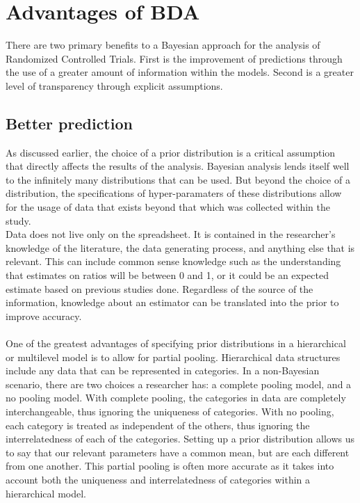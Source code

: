 \documentclass{article}
\begin{document}
\section{Advantages of BDA}
There are two primary benefits to a Bayesian approach for the analysis of Randomized Controlled Trials. First is the improvement of predictions through the use of a greater amount of information within the models. Second is a greater level of transparency through explicit assumptions. 
\subsection{Better prediction}
As discussed earlier, the choice of a prior distribution is a critical assumption that directly affects the results of the analysis. Bayesian analysis lends itself well to the infinitely many distributions that can be used. But beyond the choice of a distribution, the specifications of hyper-paramaters of these distributions allow for the usage of data that exists beyond that which was collected within the study.\\
Data does not live only on the spreadsheet. It is contained in the researcher's knowledge of the literature, the data generating process, and anything else that is relevant. This can include common sense knowledge such as the understanding that estimates on ratios will be between 0 and 1, or it could be an expected estimate based on previous studies done. Regardless of the source of the information, knowledge about an estimator can be translated into the prior to improve accuracy. \\ \\
One of the greatest advantages of specifying prior distributions in a hierarchical or multilevel model is to allow for partial pooling. Hierarchical data structures include any data that can be represented in categories. In a non-Bayesian scenario, there are two choices a researcher has: a complete pooling model, and a no pooling model. With complete pooling, the categories in data are completely interchangeable, thus ignoring the uniqueness of categories. With no pooling, each category is treated as independent of the others, thus ignoring the interrelatedness of each of the categories. Setting up a prior distribution allows us to say that our relevant parameters have a common mean, but are each different from one another. This partial pooling is often more accurate as it takes into account both the uniqueness and interrelatedness of categories within a hierarchical model.\\
\end{document}
